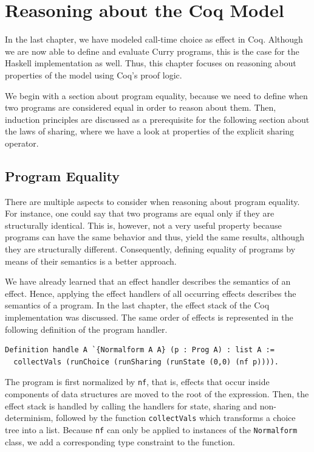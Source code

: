 \documentclass[a4paper, 11pt, fleqn, twoside, abstract=on]{scrreprt}
\newcommand{\cinl}[1]{\texttt{#1}}
\begin{document}
\chapter{Reasoning about the Coq Model}
\label{ch:progsInCoq}

In the last chapter, we have modeled call-time choice as effect in Coq.
Although we are now able to define and evaluate Curry programs, this is the case for the Haskell implementation as well.
Thus, this chapter focuses on reasoning about properties of the model using Coq's proof logic.

We begin with a section about program equality, because we need to define when two programs are considered equal in order to reason about them.
Then, induction principles are discussed as a prerequisite for the following section about the laws of sharing, where we have a look at properties
of the explicit sharing operator.

\section{Program Equality}

There are multiple aspects to consider when reasoning about program equality.
For instance, one could say that two programs are equal only if they are structurally identical.
This is, however, not a very useful property because programs can have the same behavior and thus, yield the same results, although they are structurally different.
Consequently, defining equality of programs by means of their semantics is a better approach.

We have already learned that an effect handler describes the semantics of an effect.
Hence, applying the effect handlers of all occurring effects describes the semantics of a program.
In the last chapter, the effect stack of the Coq implementation was discussed.
The same order of effects is represented in the following definition of the program handler.

\begin{verbatim}
Definition handle A `{Normalform A A} (p : Prog A) : list A :=
  collectVals (runChoice (runSharing (runState (0,0) (nf p)))).
\end{verbatim}
\noindent
The program is first normalized by \cinl{nf}, that is, effects that occur inside components of data structures are moved to the root of the expression.
Then, the effect stack is handled by calling the handlers for state, sharing and non-determinism, followed by the function \cinl{collectVals} which transforms a choice tree into a list.
Because \cinl{nf} can only be applied to instances of the \cinl{Normalform} class, we add a corresponding type constraint to the function.
\end{document}
